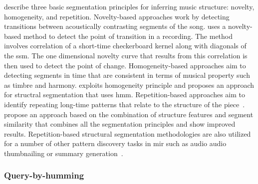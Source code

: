 \cite{paulus2010state} describe three basic segmentation principles for inferring music structure: novelty, homogeneity, and repetition. Novelty-based approaches work by detecting transitions between acoustically contrasting segments of the song. \cite{foote2000automatic} uses a novelty-based method to detect the point of transition in a recording. The method involves correlation of a short-time checkerboard kernel along with diagonals of the \gls{ssm}. The one dimensional novelty curve that results from this correlation is then used to detect the point of change. Homogeneity-based approaches aim to detecting segments in time that are consistent in terms of musical property such as timbre and harmony. \cite{Levy08TASLP} exploits homogeneity principle and proposes an approach for structral segmentation that uses \acrfull{hmm}. Repetition-based approaches aim to identify repeating long-time patterns that relate to the structure of the piece~\cite{Goto06TASLP,dannenberg2003pattern,muller2006towards}.  \cite{serra2014unsupervised} propose an approach based on the combination of structure features and segment similarity that combines all the segmentation principles and show improved results. Repetition-based structural segmentation methodologies are also utilized for a number of other pattern discovery tasks in \gls{mir} such as audio audio thumbnailing or summary generation~\cite{chai2003music,aucouturier2002finding,muller2013robust,nieto2012compressing}. 




 


\subsubsection{Query-by-humming}
\label{sec:query_by_humming}

